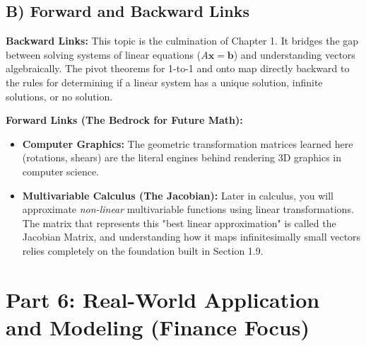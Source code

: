 \documentclass[11pt]{article}
\begin{document}
\subsection{B) Forward and Backward Links}
\textbf{Backward Links:} This topic is the culmination of Chapter 1. It bridges the gap between solving systems of linear equations ($A\mathbf{x} = \mathbf{b}$) and understanding vectors algebraically. The pivot theorems for 1-to-1 and onto map directly backward to the rules for determining if a linear system has a unique solution, infinite solutions, or no solution.

\textbf{Forward Links (The Bedrock for Future Math):}
\begin{itemize}
    \item \textbf{Computer Graphics:} The geometric transformation matrices learned here (rotations, shears) are the literal engines behind rendering 3D graphics in computer science.
    \item \textbf{Multivariable Calculus (The Jacobian):} Later in calculus, you will approximate \textit{non-linear} multivariable functions using linear transformations. The matrix that represents this "best linear approximation" is called the Jacobian Matrix, and understanding how it maps infinitesimally small vectors relies completely on the foundation built in Section 1.9.
\end{itemize}

\newpage
\section{Part 6: Real-World Application and Modeling (Finance Focus)}
\end{document}

